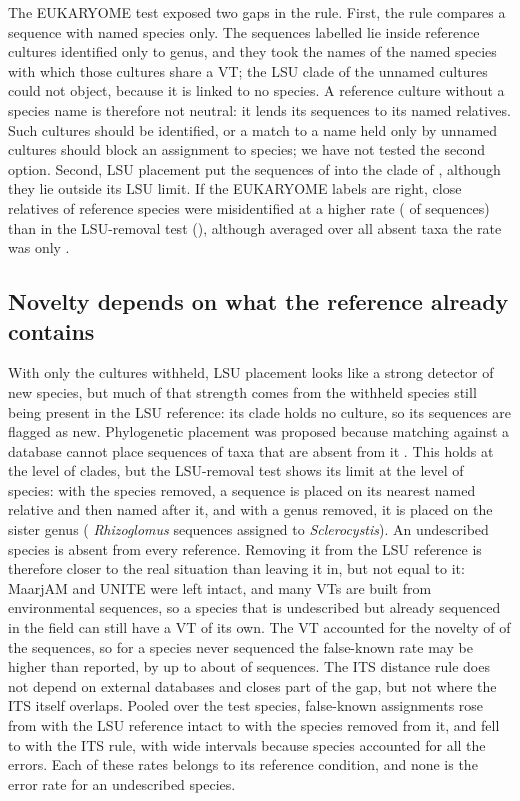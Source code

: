 \documentclass[11pt]{article}
\newcommand{\spn}[1]{\emph{#1}}   %
\begin{document}
The EUKARYOME test exposed two gaps in the rule. First, the rule compares a sequence with named species only. The
\EkFxGenusOnlyInside{} sequences labelled \EkFxGenusOnlyTaxa{} lie inside reference cultures identified only to genus,
and they took the names of the named species with which those cultures share a VT; the LSU clade of the unnamed
cultures could not object, because it is linked to no species. A reference culture without a species name is
therefore not neutral: it lends its sequences to its named relatives. Such cultures should be identified, or a match
to a name held only by unnamed cultures should block an assignment to species; we have not tested the second option.
Second, LSU placement put the \EkFxNotInside{} sequences of \EkFxNotInsideTaxa{} into the clade of
\EkFxNotInsideAssigned{}, although they lie outside its LSU limit. If the EUKARYOME labels are right, close relatives
of reference species were misidentified at a higher rate (\EkFxSpPct{} of sequences) than in the LSU-removal test
(\MfourFKvTwoPct{}), although averaged over all absent taxa the rate was only \EkFKPct{}.

\subsection{Novelty depends on what the reference already contains}
With only the cultures withheld, LSU placement looks like a strong detector of new species, but much of that strength
comes from the withheld species still being present in the LSU reference: its clade holds no culture, so its
sequences are flagged as new. Phylogenetic placement was proposed because matching against a database cannot place
sequences of taxa that are absent from it \cite{delavaux2021lsu,delavaux2022lsu}. This holds at the level of clades,
but the LSU-removal test shows its limit at the level of species: with the species removed, a sequence is placed on
its nearest named relative and then named after it, and with a genus removed, it is placed on the sister genus
(\GenusWrongN{} \spn{Rhizoglomus} sequences assigned to \spn{Sclerocystis}). An undescribed species is absent from
every reference. Removing it from the LSU reference is therefore closer to the real situation than leaving it in, but
not equal to it: MaarjAM and UNITE were left intact, and many VTs are built from environmental sequences, so a species
that is undescribed but already sequenced in the field can still have a VT of its own. The VT accounted for the
novelty of \MfourNOne{} of the \MfourHeldN{} sequences, so for a species never sequenced the false-known rate may be
higher than reported, by up to about \MfourNOnePct{} of sequences. The ITS distance rule does not depend on external
databases and closes part of the gap, but not where the ITS itself overlaps. Pooled over the test species,
false-known assignments rose from \MfourControlPct{} with the LSU reference intact to \MfourFKvOnePct{} with the
species removed from it, and fell to \MfourFKvTwoPct{} with the ITS rule, with wide intervals because
\CiMfourVTwoSpN{} species accounted for all the errors. Each of these rates belongs to its reference condition, and
none is the error rate for an undescribed species.
\end{document}
